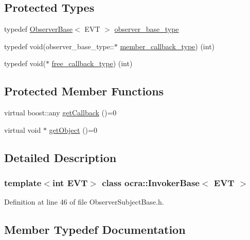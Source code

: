 \subsection*{Protected Types}
\begin{DoxyCompactItemize}
\item 
typedef \hyperlink{classocra_1_1ObserverBase}{Observer\+Base}$<$ E\+VT $>$ \hyperlink{classocra_1_1InvokerBase_a186d1d95173d5875d4cdf113312d3b12}{observer\+\_\+base\+\_\+type}
\item 
typedef void(observer\+\_\+base\+\_\+type\+::$\ast$ \hyperlink{classocra_1_1InvokerBase_ab20a012fb61b3ffde70547b1f696f3bc}{member\+\_\+callback\+\_\+type}) (int)
\item 
typedef void($\ast$ \hyperlink{classocra_1_1InvokerBase_a19d9d2e44df4df24b203e918ead8d01e}{free\+\_\+callback\+\_\+type}) (int)
\end{DoxyCompactItemize}
\subsection*{Protected Member Functions}
\begin{DoxyCompactItemize}
\item 
virtual boost\+::any \hyperlink{classocra_1_1InvokerBase_aab9488dbb26120ccfa7c77be11c01ba9}{get\+Callback} ()=0
\item 
virtual void $\ast$ \hyperlink{classocra_1_1InvokerBase_a90d81926209cb3119933412f742bc245}{get\+Object} ()=0
\end{DoxyCompactItemize}


\subsection{Detailed Description}
\subsubsection*{template$<$int E\+VT$>$\newline
class ocra\+::\+Invoker\+Base$<$ E\+V\+T $>$}



Definition at line 46 of file Observer\+Subject\+Base.\+h.



\subsection{Member Typedef Documentation}
\hypertarget{classocra_1_1InvokerBase_a19d9d2e44df4df24b203e918ead8d01e}{}\label{classocra_1_1InvokerBase_a19d9d2e44df4df24b203e918ead8d01e} 

